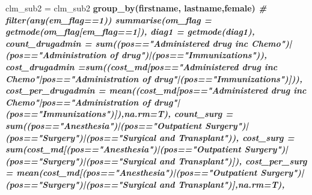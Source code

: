 \documentclass[]{article}
\newenvironment{Shaded}{\begin{snugshade}}{\end{snugshade}}
\newcommand{\KeywordTok}[1]{\textcolor[rgb]{0.13,0.29,0.53}{\textbf{#1}}}
\newcommand{\DataTypeTok}[1]{\textcolor[rgb]{0.13,0.29,0.53}{#1}}
\newcommand{\DecValTok}[1]{\textcolor[rgb]{0.00,0.00,0.81}{#1}}
\newcommand{\StringTok}[1]{\textcolor[rgb]{0.31,0.60,0.02}{#1}}
\newcommand{\CommentTok}[1]{\textcolor[rgb]{0.56,0.35,0.01}{\textit{#1}}}
\newcommand{\OperatorTok}[1]{\textcolor[rgb]{0.81,0.36,0.00}{\textbf{#1}}}
\newcommand{\NormalTok}[1]{#1}
\begin{document}
\begin{Shaded}
\begin{Highlighting}[]
{{{\NormalTok{clm_sub2 =}\StringTok{ }\NormalTok{clm_sub2 }\OperatorTok{%>%}
\StringTok{  }\KeywordTok{group_by}\NormalTok{(firstname, lastname,female) }\OperatorTok{%>%}
\StringTok{  }\CommentTok{# filter(any(em_flag==1)) %>%}
\StringTok{  }\KeywordTok{summarise}\NormalTok{(}\DataTypeTok{om_flag =} \KeywordTok{getmode}\NormalTok{(om_flag[em_flag}\OperatorTok{==}\DecValTok{1}\NormalTok{]),}
            \DataTypeTok{diag1 =} \KeywordTok{getmode}\NormalTok{(diag1),}
            \DataTypeTok{count_drugadmin =} \KeywordTok{sum}\NormalTok{((pos}\OperatorTok{==}\StringTok{"Administered drug inc Chemo"}\NormalTok{)}\OperatorTok{|}\NormalTok{(pos}\OperatorTok{==}\StringTok{"Administration of drug"}\NormalTok{)}\OperatorTok{|}\NormalTok{(pos}\OperatorTok{==}\StringTok{"Immunizations"}\NormalTok{)),}
            \DataTypeTok{cost_drugadmin =}\KeywordTok{sum}\NormalTok{((cost_md[pos}\OperatorTok{==}\StringTok{"Administered drug inc Chemo"}\OperatorTok{|}\NormalTok{pos}\OperatorTok{==}\StringTok{"Administration of drug"}\OperatorTok{|}\NormalTok{(pos}\OperatorTok{==}\StringTok{"Immunizations"}\NormalTok{)])),}
            \DataTypeTok{cost_per_drugadmin =} \KeywordTok{mean}\NormalTok{((cost_md[pos}\OperatorTok{==}\StringTok{"Administered drug inc Chemo"}\OperatorTok{|}\NormalTok{pos}\OperatorTok{==}\StringTok{"Administration of drug"}\OperatorTok{|}\NormalTok{(pos}\OperatorTok{==}\StringTok{"Immunizations"}\NormalTok{)]),}\DataTypeTok{na.rm=}\NormalTok{T),}
            \DataTypeTok{count_surg =} \KeywordTok{sum}\NormalTok{((pos}\OperatorTok{==}\StringTok{"Anesthesia"}\NormalTok{)}\OperatorTok{|}\NormalTok{(pos}\OperatorTok{==}\StringTok{"Outpatient Surgery"}\NormalTok{)}\OperatorTok{|}\NormalTok{(pos}\OperatorTok{==}\StringTok{"Surgery"}\NormalTok{)}\OperatorTok{|}\NormalTok{(pos}\OperatorTok{==}\StringTok{"Surgical and Transplant"}\NormalTok{)),}
            \DataTypeTok{cost_surg =} \KeywordTok{sum}\NormalTok{(cost_md[(pos}\OperatorTok{==}\StringTok{"Anesthesia"}\NormalTok{)}\OperatorTok{|}\NormalTok{(pos}\OperatorTok{==}\StringTok{"Outpatient Surgery"}\NormalTok{)}\OperatorTok{|}\NormalTok{(pos}\OperatorTok{==}\StringTok{"Surgery"}\NormalTok{)}\OperatorTok{|}\NormalTok{(pos}\OperatorTok{==}\StringTok{"Surgical and Transplant"}\NormalTok{)]),}
            \DataTypeTok{cost_per_surg =} \KeywordTok{mean}\NormalTok{(cost_md[(pos}\OperatorTok{==}\StringTok{"Anesthesia"}\NormalTok{)}\OperatorTok{|}\NormalTok{(pos}\OperatorTok{==}\StringTok{"Outpatient Surgery"}\NormalTok{)}\OperatorTok{|}\NormalTok{(pos}\OperatorTok{==}\StringTok{"Surgery"}\NormalTok{)}\OperatorTok{|}\NormalTok{(pos}\OperatorTok{==}\StringTok{"Surgical and Transplant"}\NormalTok{)],}\DataTypeTok{na.rm=}\NormalTok{T),}
}}}}}}
\end{Highlighting}
\end{Shaded}
\end{document}
